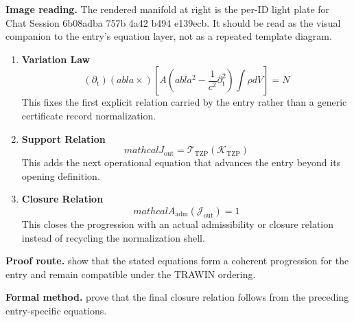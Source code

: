\begin{samepage}
\noindent\begin{minipage}[t]{0.45\linewidth}
\vspace{0pt}
\raggedright
\scriptsize\textbf{Image reading.} The rendered manifold at right is the per-ID light plate for Chat Session 6b08adba 757b 4a42 b494 e139ecb. It should be read as the visual companion to the entry's equation layer, not as a repeated template diagram.\par
\end{minipage}\hfill
\begin{minipage}[t]{0.53\linewidth}
\vspace*{-0.10in}
\raggedright
{}
\end{minipage}
\end{samepage}

\clearpage


\begin{enumerate}[leftmargin=1.6em,itemsep=9pt,topsep=6pt]
\item \textbf{Variation Law}
\[
(\partial_{\mathrm{t}})( abla \times)[A ( abla^2 - \frac{1}{c^2}\partial_{\mathrm{t}}^2) \int \rho dV] = N
\]
This fixes the first explicit relation carried by the entry rather than a generic certificate record normalization.

\item \textbf{Support Relation}
\[
mathcal{J}_{\mathrm{out}} = \mathcal{T}_{\mathrm{TZP}}\!\left(\mathcal{K}_{\mathrm{TZP}}\right)
\]
This adds the next operational equation that advances the entry beyond its opening definition.

\item \textbf{Closure Relation}
\[
mathcal{A}_{\mathrm{adm}}\!\left(\mathcal{J}_{\mathrm{out}}\right)=1
\]
This closes the progression with an actual admissibility or closure relation instead of recycling the normalization shell.
\end{enumerate}

\textbf{Proof route.} show that the stated equations form a coherent progression for the entry and remain compatible under the TRAWIN ordering.

\textbf{Formal method.} prove that the final closure relation follows from the preceding entry-specific equations.

